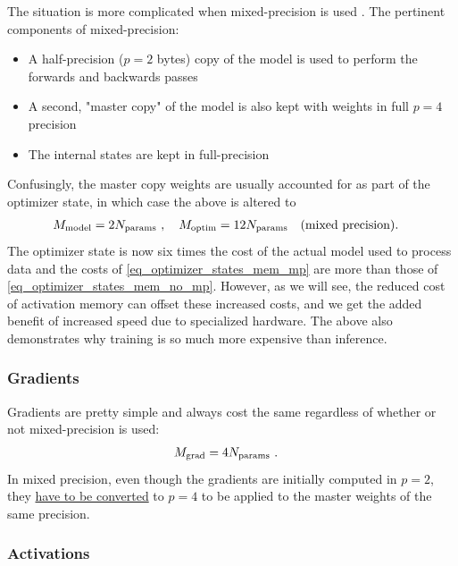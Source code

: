 \documentclass[11pt]{article}
\begin{document}
The situation is more complicated when mixed-precision is used \cite{micikevicius2018mixed}.
The pertinent components of mixed-precision:
\begin{itemize}
	\item A half-precision ($ p=2 $ bytes) copy of the model is used to perform the forwards and
	      backwards passes
	\item A second, "master copy" of the model is also kept with weights in full $ p=4 $ precision
	\item The internal  states are kept in full-precision
\end{itemize}
Confusingly, the master copy weights are usually accounted for as part of the optimizer state, in
which case the above is altered to
\begin{align}
	M _{ \rm model} & = 2 N _{ \rm params } \ , \quad M_{ \rm  optim } = 12 N _{ \rm params }
	\quad ({\rm mixed \ precision}) .
	\label{eq_optimizer_states_mem_mp}
\end{align}
The optimizer state is now six times the cost of the actual model used to process data and the costs
of \eqref{eq_optimizer_states_mem_mp} are more than those of \eqref{eq_optimizer_states_mem_no_mp}.
However, as we will see, the reduced cost of activation memory can offset these increased costs, and
we get the added benefit of increased speed due to specialized hardware. The above also demonstrates
why training is so much more expensive than inference.


\subsubsection{Gradients}

Gradients are pretty simple and always cost the same regardless of whether or not mixed-precision is
used:
\begin{align}
	M_{ \rm grad} & = 4 N _{ \rm params }     \label{eq_grad_memory} \ .
\end{align}
In mixed precision, even though the gradients are initially computed in $ p= 2$, they
\href{https://huggingface.co/docs/transformers/v4.20.1/en/perf_train_gpu_one#anatomy-of-models-memory}{have to
	be converted} to $ p=4 $ to be applied to the master weights of the same precision.




\subsubsection{Activations}
\end{document}
